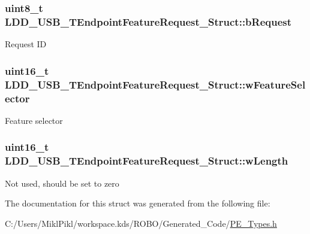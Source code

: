 \subsubsection[{b\+Request}]{\setlength{\rightskip}{0pt plus 5cm}uint8\+\_\+t L\+D\+D\+\_\+\+U\+S\+B\+\_\+\+T\+Endpoint\+Feature\+Request\+\_\+\+Struct\+::b\+Request}\label{struct_l_d_d___u_s_b___t_endpoint_feature_request___struct_acd2dcd4a8762d22f84cfe3b9d9607a25}
Request I\+D \hypertarget{struct_l_d_d___u_s_b___t_endpoint_feature_request___struct_aa026e7ce420430dc65a72dcc10337553}{}
\subsubsection[{w\+Feature\+Selector}]{\setlength{\rightskip}{0pt plus 5cm}uint16\+\_\+t L\+D\+D\+\_\+\+U\+S\+B\+\_\+\+T\+Endpoint\+Feature\+Request\+\_\+\+Struct\+::w\+Feature\+Selector}\label{struct_l_d_d___u_s_b___t_endpoint_feature_request___struct_aa026e7ce420430dc65a72dcc10337553}
Feature selector \hypertarget{struct_l_d_d___u_s_b___t_endpoint_feature_request___struct_aec7dc034039bc4deb5c811afac0686a5}{}
\subsubsection[{w\+Length}]{\setlength{\rightskip}{0pt plus 5cm}uint16\+\_\+t L\+D\+D\+\_\+\+U\+S\+B\+\_\+\+T\+Endpoint\+Feature\+Request\+\_\+\+Struct\+::w\+Length}\label{struct_l_d_d___u_s_b___t_endpoint_feature_request___struct_aec7dc034039bc4deb5c811afac0686a5}
Not used, should be set to zero 

The documentation for this struct was generated from the following file\+:\begin{DoxyCompactItemize}
\item 
C\+:/\+Users/\+Mikl\+Pikl/workspace.\+kds/\+R\+O\+B\+O/\+Generated\+\_\+\+Code/\hyperlink{_p_e___types_8h}{P\+E\+\_\+\+Types.\+h}\end{DoxyCompactItemize}
